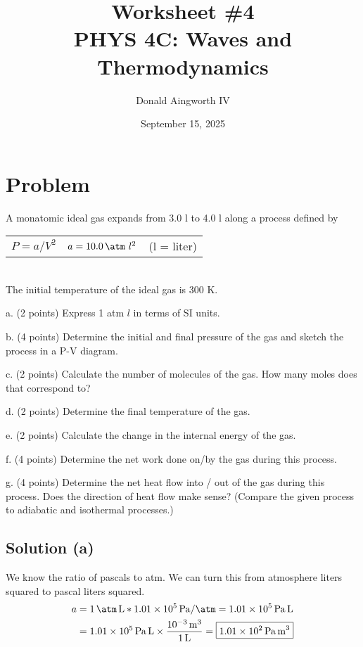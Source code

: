 \documentclass[12pt]{article}
\title{
    Worksheet \#4
    \\  \small
    PHYS 4C: Waves and Thermodynamics
    }
\author{Donald Aingworth IV}
\date{September 15, 2025}
\newcommand{\E}[1]{\times 10^{#1}}
\begin{document}

    \maketitle

    \section{Problem}
        A monatomic ideal gas expands from 3.0 l to 4.0 l along a process deﬁned by\\
        \begin{tabular}[pos]{l c r}
            $P = a/V^2$  &$a = 10.0\,\unit{\atm}\ l^2$ &(l = liter)
        \end{tabular}\\
        The initial temperature of the ideal gas is 300 K.

        a. (2 points) Express 1 atm $l$ in terms of SI units.

        b. (4 points) Determine the initial and ﬁnal pressure of the gas and sketch the process in a P-V diagram.

        c. (2 points) Calculate the number of molecules of the gas. How many moles does that correspond to?

        d. (2 points) Determine the ﬁnal temperature of the gas.

        e. (2 points) Calculate the change in the internal energy of the gas.

        f. (4 points) Determine the net work done on/by the gas during this process.

        g. (4 points) Determine the net heat ﬂow into / out of the gas during this process. 
        Does the direction of heat ﬂow make sense? 
        (Compare the given process to adiabatic and isothermal processes.)

        \subsection{Solution (a)}
            We know the ratio of pascals to atm. 
            We can turn this from atmosphere liters squared to pascal liters squared.
            \begin{align}
                a   &=  1\,\unit{\atm\,\liter} * 1.01\E{5}\,\unit{\pascal/\atm}
                    =   1.01\E{5}\,\unit{\pascal\,\liter}\\
                    &=  1.01\E{5}\,\unit{\pascal\,\liter} \times \frac{10^{-3}\,\unit{\meter^3}}{1\,\unit{\liter}}
                    =   \boxed{1.01\E{2}\,\unit{\pascal\,\meter^3}}
            \end{align}
\end{document}
